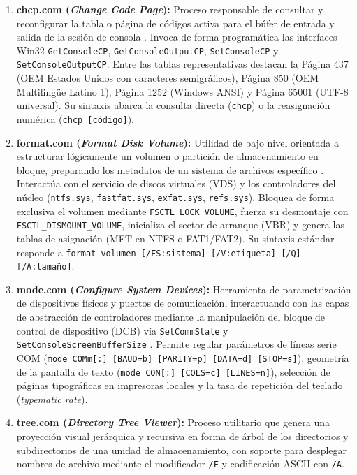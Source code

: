 \documentclass[12pt]{article}
\begin{document}
\begin{enumerate}[leftmargin=*]
    \item \textbf{chcp.com (\textit{Change Code Page}):} Proceso responsable de consultar y reconfigurar la tabla o página de códigos activa para el búfer de entrada y salida de la sesión de consola \parencite{microsoftCommands}. Invoca de forma programática las interfaces Win32 \texttt{GetConsoleCP}, \texttt{GetConsoleOutputCP}, \texttt{SetConsoleCP} y \texttt{SetConsoleOutputCP}. Entre las tablas representativas destacan la Página 437 (OEM Estados Unidos con caracteres semigráficos), Página 850 (OEM Multilingüe Latino 1), Página 1252 (Windows ANSI) y Página 65001 (UTF-8 universal). Su sintaxis abarca la consulta directa (\texttt{chcp}) o la reasignación numérica (\texttt{chcp [código]}).
    
    \item \textbf{format.com (\textit{Format Disk Volume}):} Utilidad de bajo nivel orientada a estructurar lógicamente un volumen o partición de almacenamiento en bloque, preparando los metadatos de un sistema de archivos específico \parencite{microsoftCommands}. Interactúa con el servicio de discos virtuales (VDS) y los controladores del núcleo (\texttt{ntfs.sys}, \texttt{fastfat.sys}, \texttt{exfat.sys}, \texttt{refs.sys}). Bloquea de forma exclusiva el volumen mediante \texttt{FSCTL\_LOCK\_VOLUME}, fuerza su desmontaje con \texttt{FSCTL\_DISMOUNT\_VOLUME}, inicializa el sector de arranque (VBR) y genera las tablas de asignación (MFT en NTFS o FAT1/FAT2). Su sintaxis estándar responde a \texttt{format volumen [/FS:sistema] [/V:etiqueta] [/Q] [/A:tamaño]}.
    
    \item \textbf{mode.com (\textit{Configure System Devices}):} Herramienta de parametrización de dispositivos físicos y puertos de comunicación, interactuando con las capas de abstracción de controladores mediante la manipulación del bloque de control de dispositivo (DCB) vía \texttt{SetCommState} y \texttt{SetConsoleScreenBufferSize} \parencite{microsoftCommands}. Permite regular parámetros de líneas serie COM (\texttt{mode COMm[:] [BAUD=b] [PARITY=p] [DATA=d] [STOP=s]}), geometría de la pantalla de texto (\texttt{mode CON[:] [COLS=c] [LINES=n]}), selección de páginas tipográficas en impresoras locales y la tasa de repetición del teclado (\textit{typematic rate}).
    
    \item \textbf{tree.com (\textit{Directory Tree Viewer}):} Proceso utilitario que genera una proyección visual jerárquica y recursiva en forma de árbol de los directorios y subdirectorios de una unidad de almacenamiento, con soporte para desplegar nombres de archivo mediante el modificador \texttt{/F} y codificación ASCII con \texttt{/A}.
    

\end{enumerate}
\end{document}
